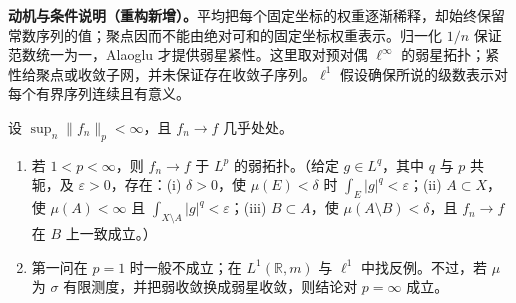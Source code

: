 \documentclass[../../main.tex]{subfiles}
\begin{document}
\begin{remark}
\textbf{动机与条件说明（重构新增）。}平均把每个固定坐标的权重逐渐稀释，却始终保留常数序列的值；聚点因而不能由绝对可和的固定坐标权重表示。归一化 $1/n$ 保证范数统一为一，Alaoglu 才提供弱星紧性。这里取对预对偶 $\ell^\infty$ 的弱星拓扑；紧性给聚点或收敛子网，并未保证存在收敛子序列。$\ell^1$ 假设确保所说的级数表示对每个有界序列连续且有意义。
\end{remark}
\begin{exercise}\label{exercise:ch06-ae-bounded-weak}
设 $\sup_n\|f_n\|_p<\infty$，且 $f_n\to f$ 几乎处处。
\begin{enumerate}
\item\label{item:ch06-ae-bounded-weak-interior} 若 $1<p<\infty$，则 $f_n\to f$ 于 $L^p$ 的弱拓扑。（给定 $g\in L^q$，其中 $q$ 与 $p$ 共轭，及 $\varepsilon>0$，存在：(i) $\delta>0$，使 $\mu(E)<\delta$ 时 $\int_E|g|^q<\varepsilon$；(ii) $A\subset X$，使 $\mu(A)<\infty$ 且 $\int_{X\setminus A}|g|^q<\varepsilon$；(iii) $B\subset A$，使 $\mu(A\setminus B)<\delta$，且 $f_n\to f$ 在 $B$ 上一致成立。）
\item\label{item:ch06-ae-bounded-weak-endpoints} 第一问在 $p=1$ 时一般不成立；在 $L^1(\mathbb R,m)$ 与 $\ell^1$ 中找反例。不过，若 $\mu$ 为 $\sigma$ 有限测度，并把弱收敛换成弱星收敛，则结论对 $p=\infty$ 成立。
\end{enumerate}
\end{exercise}
\end{document}
